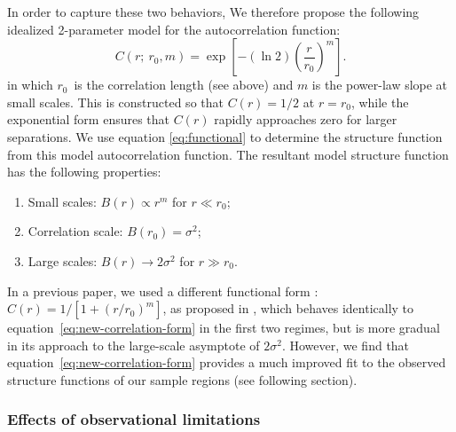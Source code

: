 \documentclass[fleqn,usenatbib, useAMS, a4paper]{mnras}
\begin{document}
In order to capture these two behaviors,
We therefore propose the following idealized 2-parameter model
for the autocorrelation function:
%
\begin{equation}\label{eq:new-correlation-form}
  C(r;\ r_0, m) = \exp \left[ -(\ln 2) \left( \frac{r}{r_0} \right)^m \right].
\end{equation}
%
in which \(r_{0}\)\ is the correlation length (see above)
and \(m\) is the power-law slope at small scales.
This is constructed so that \(C(r) = 1/2\) at \(r = r_0\),
while the exponential form ensures that \(C(r)\) rapidly approaches zero
for larger separations.
We use equation \eqref{eq:functional} to determine the structure function
from this model autocorrelation function.
The resultant model structure function has the following properties:
\begin{enumerate}[1.]
 \item Small scales: \(B(r) \propto r^m\) for \(r \ll r_0\);
 \item Correlation scale: \(B(r_0) = \sigma^2\);
 \item Large scales: \(B(r) \to 2 \sigma^2\) for \(r \gg r_0\).
\end{enumerate}
In a previous paper, we used a different functional form
\citetext{See Fig.~13 of \citealp{arthur2016turbulence}}:
\(C(r) = 1/[1+(r/r_{0})^{m}]\), as proposed in \citet{1984ApJ...277..556S},
which behaves identically to equation~\eqref{eq:new-correlation-form}
in the first two regimes, but is more gradual in its approach
to the large-scale asymptote of \(2 \sigma^2\).
However, we find that equation~\eqref{eq:new-correlation-form}
provides a much improved fit to the observed structure functions
of our sample regions (see following section). 



\subsubsection{Effects of observational limitations}
\label{sec:effect-observ-limit}
\end{document}
